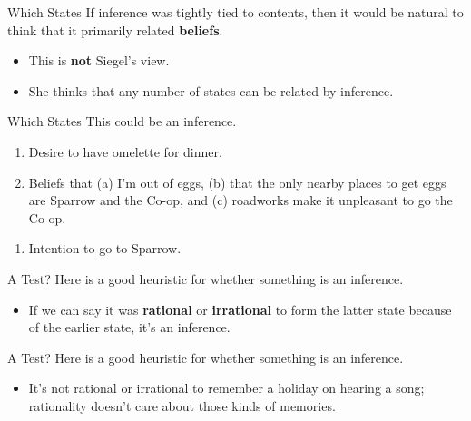 \documentclass[
  17pt,
  letterpaper,
  ignorenonframetext,
  aspectratio=169,
  handout,
  xcolor={dvipsnames}]{beamer}
\providecommand{\tightlist}{%
  \setlength{\itemsep}{0pt}\setlength{\parskip}{0pt}}\usepackage{longtable,booktabs,array}
\begin{document}
\begin{frame}{Which States}
\protect\hypertarget{which-states}{}
If inference was tightly tied to contents, then it would be natural to
think that it primarily related \textbf{beliefs}.

\begin{itemize}[<+->]
\tightlist
\item
  This is \textbf{not} Siegel's view.
\item
  She thinks that any number of states can be related by inference.
\end{itemize}
\end{frame}

\begin{frame}{Which States}
\protect\hypertarget{which-states-1}{}
This could be an inference.

\begin{enumerate}[<+->]
\tightlist
\item
  Desire to have omelette for dinner.
\item
  Beliefs that (a) I'm out of eggs, (b) that the only nearby places to
  get eggs are Sparrow and the Co-op, and (c) roadworks make it
  unpleasant to go the Co-op.
\end{enumerate}

\begin{enumerate}[<+->]
[A.]
\setcounter{enumi}{2}
\tightlist
\item
  Intention to go to Sparrow.
\end{enumerate}
\end{frame}

\begin{frame}{A Test?}
\protect\hypertarget{a-test}{}
Here is a good heuristic for whether something is an inference.

\begin{itemize}[<+->]
\tightlist
\item
  If we can say it was \textbf{rational} or \textbf{irrational} to form
  the latter state because of the earlier state, it's an inference.
\end{itemize}
\end{frame}

\begin{frame}{A Test?}
\protect\hypertarget{a-test-1}{}
Here is a good heuristic for whether something is an inference.

\begin{itemize}[<+->]
\tightlist
\item
  It's not rational or irrational to remember a holiday on hearing a
  song; rationality doesn't care about those kinds of memories.
\end{itemize}
\end{frame}
\end{document}
